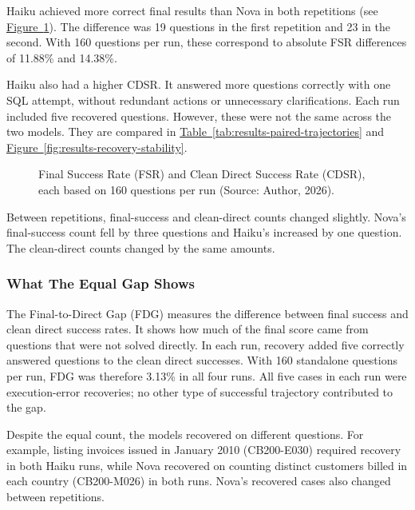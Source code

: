 Haiku achieved more correct final results than Nova in both repetitions
(see \hyperref[fig:results-correctness]{Figure~\ref*{fig:results-correctness}}). 
The difference was 19 questions in the first repetition and 23 in the second. 
With 160 questions per run, these
correspond to absolute FSR differences of 11.88\% and 14.38\%.

Haiku also had a higher CDSR.
It answered more questions correctly with one SQL attempt, 
without redundant actions or unnecessary clarifications.
Each run included five recovered questions.
However, these were not the same across the two models. 
They are compared in
\hyperref[tab:results-paired-trajectories]{Table~\ref*{tab:results-paired-trajectories}}
and \hyperref[fig:results-recovery-stability]{Figure~\ref*{fig:results-recovery-stability}}.

\begin{figure}[H]
\centering

\caption{Final Success Rate (FSR) and Clean Direct Success Rate (CDSR), each based on 160 questions per run (Source: Author, 2026).}
\label{fig:results-correctness}
\end{figure}

Between repetitions, final-success and clean-direct counts changed slightly.
Nova's final-success count fell by three questions and Haiku's increased by one question. 
The clean-direct counts changed by the same amounts.

\subsubsection{What The Equal Gap Shows}

The Final-to-Direct Gap (FDG) measures the difference between final success
and clean direct success rates. 
It shows how much of the final score came from
questions that were not solved directly.
In each run, recovery added five correctly answered questions
to the clean direct successes.
With 160 standalone questions per run, FDG was therefore 3.13\%
in all four runs.
All five cases in each run were execution-error recoveries;
no other type of successful trajectory contributed to the gap.

Despite the equal count, the models recovered on different questions.
For example, listing invoices issued in January 2010 (CB200-E030)
required recovery in both Haiku runs, while Nova recovered on counting
distinct customers billed in each country (CB200-M026) in both runs.
Nova's recovered cases also changed between repetitions.

